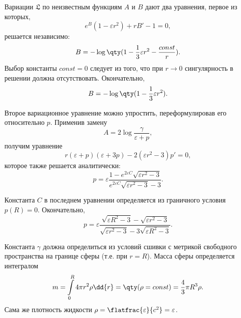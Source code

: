 \documentclass[\docroot/reports/draft/report.tex]{subfiles}
\begin{document}
    Вариации $\mathfrak{L}$ по неизвестным функциям $A$ и $B$ дают два уравнения, первое из которых,
    \begin{equation*}
        e^B (1 - \varepsilon r^2) + r B' - 1 = 0 ,
    \end{equation*}
    решается независимо:
    \begin{equation*}
        B = - \log\qty(1 - \frac{1}{3} \varepsilon r^2 - \frac{const}{r}) .
    \end{equation*}
    Выбор константы $const = 0$ следует из того, что при $r \to 0$ сингулярность в решении должна отсутствовать. Окончательно,
    \begin{equation*}
        B = - \log\qty(1 - \frac{1}{3} \varepsilon r^2) .
    \end{equation*}

    Второе вариационное уравнение можно упростить, переформулировав его относительно $p$. Применив замену
    \begin{equation*}
        A = 2 \log{\frac{\gamma}{\varepsilon + p}} ,
    \end{equation*}
    получим уравнение
    \begin{equation*}
        r (\varepsilon + p) (\varepsilon + 3 p) - 2 (\varepsilon r^2 - 3) p' = 0 ,
    \end{equation*}
    которое также решается аналитически:
    \begin{equation*}
        p = \varepsilon \frac{1 - e^{2 \varepsilon C} \sqrt{\varepsilon r^2 - 3}}{e^{2 \varepsilon C} \sqrt{\varepsilon r^2 - 3} - 3} .
    \end{equation*}

    Константа $C$ в последнем уравнении определяется из граничного условия $p(R) = 0$. Окончательно,
    \begin{equation}
        p = \varepsilon \frac{\sqrt{\varepsilon R^2 - 3} - \sqrt{\varepsilon r^2 - 3}}{
            \sqrt{\varepsilon r^2 - 3} - 3 \sqrt{\varepsilon R^2 - 3}} .
    \end{equation}

    Константа $\gamma$ должна определиться из условий сшивки с метрикой свободного пространства на границе сферы (т.е. при $r = R$). Масса сферы определяется интегралом
    \begin{equation*}
        m = \int\limits_0^R 4 \pi r^2 \rho \dd{r} = \qty( \rho = const ) = \frac{4}{3} \pi R^3 \rho .
    \end{equation*}
    Сама же плотность жидкости $\rho = \flatfrac{\varepsilon}{c^2} = \varepsilon$.
\end{document}
